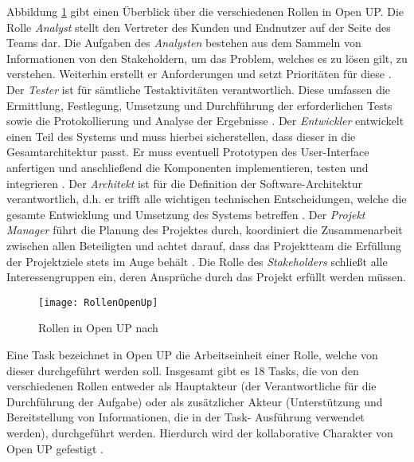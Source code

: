 Abbildung \ref{fig:RollenOpenUp} gibt einen Überblick über die verschiedenen Rollen in Open UP. Die Rolle \textit{Analyst} stellt den Vertreter des Kunden und Endnutzer auf der Seite des Teams dar. Die Aufgaben des \textit{Analysten} bestehen aus dem Sammeln von Informationen von den Stakeholdern, um das Problem, welches es zu lösen gilt, zu verstehen. Weiterhin erstellt er Anforderungen und setzt Prioritäten für diese \cite{OpenUPProcess}.\newline
Der \textit{Tester} ist für sämtliche Testaktivitäten verantwortlich. Diese umfassen die Ermittlung, Festlegung, Umsetzung und Durchführung der erforderlichen Tests sowie die Protokollierung und Analyse der Ergebnisse \cite{OpenUPProcess}.
Der \textit{Entwickler} entwickelt einen Teil des Systems und muss hierbei sicherstellen, dass dieser in die Gesamtarchitektur passt. Er muss eventuell Prototypen des User-Interface anfertigen und anschließend die Komponenten implementieren, testen und integrieren \cite{OpenUPProcess}.\newline
Der \textit{Architekt} ist für die Definition der Software-Architektur verantwortlich, d.h. er trifft alle wichtigen technischen Entscheidungen, welche die gesamte Entwicklung und Umsetzung des Systems betreffen \cite{OpenUPProcess}.\newline
Der \textit{Projekt Manager} führt die Planung des Projektes durch, koordiniert die Zusammenarbeit zwischen allen Beteiligten und achtet darauf, dass das Projektteam die Erfüllung der Projektziele stets im Auge behält \cite{OpenUPProcess}.\newline
Die Rolle des \textit{Stakeholders} schließt alle Interessengruppen ein, deren Ansprüche durch das Projekt erfüllt werden müssen. \newline

\begin{figure}[htp]
\begin{center}
  \texttt{[image: RollenOpenUp]} %
  \caption{Rollen in Open UP nach \cite{openup}}
  \label{fig:RollenOpenUp}
\end{center}
\end{figure}

Eine Task bezeichnet in Open UP die Arbeitseinheit einer Rolle, welche von dieser durchgeführt werden soll. Insgesamt gibt es 18 Tasks, die von den verschiedenen Rollen entweder als Hauptakteur (der Verantwortliche für die Durchführung der Aufgabe) oder als zusätzlicher Akteur (Unterstützung und Bereitstellung von Informationen, die in der Task- Ausführung verwendet werden), durchgeführt werden. Hierdurch wird der kollaborative Charakter von Open UP gefestigt \cite{eclipseopenup}.

